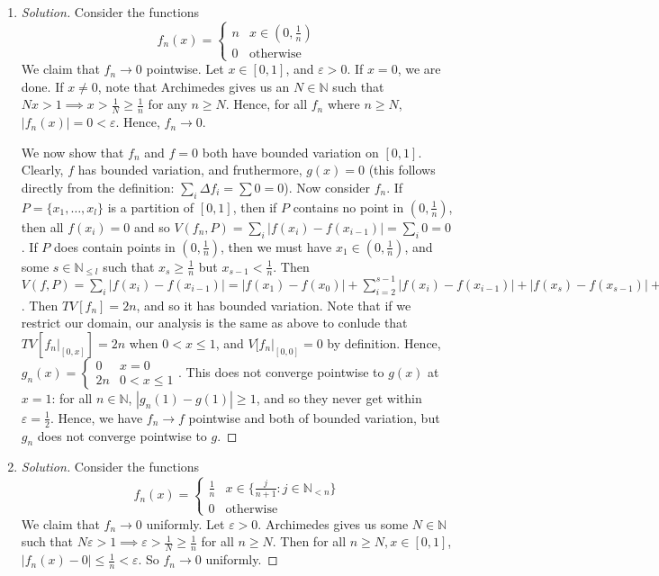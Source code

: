 \documentclass{article}
\newcommand{\N}{{\mathbb N}}
\newcommand{\ep}{{\varepsilon}}
\theoremstyle{remark}
\begin{document}
\begin{enumerate}
	\item \begin{proof}[Solution]\let\qed\relax
		Consider the functions
		\[
			f_n(x) = \begin{cases}
				n & x \in (0,\frac{1}{n})\\
				0 & \text{otherwise}
			\end{cases}
		\]
		We claim that $f_n \to 0$ pointwise.
		Let $x \in [0,1]$, and $\ep > 0$.
		If $x = 0$, we are done.
		If $x \neq 0$, note that Archimedes gives us an $N \in \N$
		such that $Nx > 1 \implies x > \frac{1}{N} \geq \frac{1}{n}$
		for any $n \geq N$.
		Hence, for all $f_n$ where $n \geq N$, $|f_n(x)| = 0 < \ep$.
		Hence, $f_n \to 0$.

		We now show that $f_n$ and $f = 0$ both have bounded variation on $[0,1]$.
		Clearly, $f$ has bounded variation, and fruthermore, $g(x) = 0$
		(this follows directly from the definition: $\sum_i \Delta f_i
		= \sum 0 = 0$).
		Now consider $f_n$.
		If $P = \{x_1,\dots,x_l\}$ is a partition of $[0,1]$,
		then if $P$ contains no point in $(0,\frac{1}{n})$,
		then all $f(x_i) = 0$ and so $V(f_n,P) = \sum_i |f(x_i) - f(x_{i-1})| = \sum_i 0 = 0$.
		If $P$ does contain points in $(0,\frac{1}{n})$,
		then we must have $x_1 \in (0,\frac{1}{n})$,
		and some $s \in \N_{\leq l}$ such that $x_s \geq \frac{1}{n}$
		but $x_{s-1} < \frac{1}{n}$.
		Then $V(f,P) = \sum_i |f(x_i) - f(x_{i-1})|
		= |f(x_1) - f(x_0)| + \sum_{i=2}^{s-1}|f(x_i) - f(x_{i-1})|
		+ |f(x_s) - f(x_{s-1})| + \sum_{i=s+1}^l |f(x_i) - f(x_{i-1})|
		= n + 0 + n + 0 = 2n$.
		Then $TV[f_n] = 2n$, and so it has bounded variation.
		Note that if we restrict our domain, our analysis is the same as above
		to conlude that $TV[f_n\vert_{[0,x]}] = 2n$ when $0 < x \leq 1$,
		and $V[f_n\vert_{[0,0]} = 0$ by definition.
		Hence, $g_n(x) = \begin{cases} 0 & x = 0\\ 2n & 0 < x \leq 1\end{cases}$.
		This does not converge pointwise to $g(x)$ at $x = 1$:
		for all $n \in \N$, $|g_n(1) - g(1)| \geq 1$,
		and so they never get within $\ep = \frac12$.
		Hence, we have $f_n \to f$ pointwise and both of bounded variation,
		but $g_n$ does not converge pointwise to $g$.
	\end{proof}
	\item \begin{proof}[Solution]\let\qed\relax
		Consider the functions
		\[
			f_n(x) = \begin{cases}
				\frac{1}{n} & x \in \{\frac{j}{n+1}\colon j \in \N_{< n}\}\\
				0 & \text{otherwise}
			\end{cases}
		\]
		We claim that $f_n \to 0$ uniformly.
		Let $\ep > 0$. Archimedes gives us some $N \in \N$
		such that $N\ep > 1 \implies \ep > \frac{1}{N} \geq \frac{1}{n}$
		for all $n \geq N$.
		Then for all $n \geq N, x \in [0,1]$, $|f_n(x) - 0| \leq \frac{1}{n} < \ep$.
		So $f_n \to 0$ uniformly.


\end{proof}
\end{enumerate}
\end{document}
